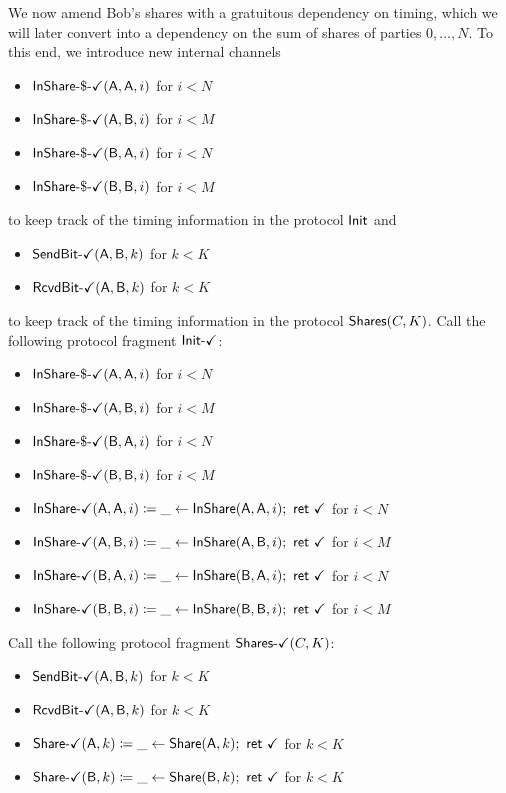 \noindent We now amend Bob's shares with a gratuitous dependency on timing, which we will later convert into a dependency on the sum of shares of parties $0,\ldots,N$. To this end, we introduce new internal channels
\begin{itemize}
\item {\color{teal} $\InShareGenOk(\A,\A,i)$ for $i < N$}
\item {\color{teal} $\InShareGenOk(\A,\B,i)$ for $i < M$}
\item {\color{teal} $\InShareGenOk(\B,\A,i)$ for $i < N$}
\item {\color{teal} $\InShareGenOk(\B,\B,i)$ for $i < M$}
\end{itemize}
to keep track of the timing information in the protocol $\Init$ and
\begin{itemize}
\item {\color{teal} $\SendBitOk(\A,\B,k)$ for $k < K$}
\item {\color{teal} $\RcvdBitOk(\A,\B,k)$ for $k < K$}
\end{itemize}
to keep track of the timing information in the protocol $\Shares(C,K)$. Call the following protocol fragment $\InitOk$:
\begin{itemize}
\item {\color{teal} $\InShareGenOk(\A,\A,i)$ for $i < N$}
\item {\color{teal} $\InShareGenOk(\A,\B,i)$ for $i < M$}
\item {\color{teal} $\InShareGenOk(\B,\A,i)$ for $i < N$}
\item {\color{teal} $\InShareGenOk(\B,\B,i)$ for $i < M$}
\item {\color{teal} $\InShareOk(\A,\A,i) \coloneqq \_ \leftarrow \InShare(\A,\A,i); \ \ret{\checkmark}$ for $i < N$}
\item {\color{teal} $\InShareOk(\A,\B,i) \coloneqq \_ \leftarrow \InShare(\A,\B,i); \ \ret{\checkmark}$ for $i < M$}
\item {\color{teal} $\InShareOk(\B,\A,i) \coloneqq \_ \leftarrow \InShare(\B,\A,i); \ \ret{\checkmark}$ for $i < N$}
\item {\color{teal} $\InShareOk(\B,\B,i) \coloneqq \_ \leftarrow \InShare(\B,\B,i); \ \ret{\checkmark}$ for $i < M$}
\end{itemize}
Call the following protocol fragment $\SharesOk(C,K)$:
\begin{itemize}
\item {\color{teal} $\SendBitOk(\A,\B,k)$ for $k < K$}
\item {\color{teal} $\RcvdBitOk(\A,\B,k)$ for $k < K$}
\item {\color{teal} $\ShareOk(\A,k) \coloneqq \_ \leftarrow \Share(\A,k); \ \ret{\checkmark}$ for $k < K$}
\item {\color{teal} $\ShareOk(\B,k) \coloneqq \_ \leftarrow \Share(\B,k); \ \ret{\checkmark}$ for $k < K$}
\end{itemize}

